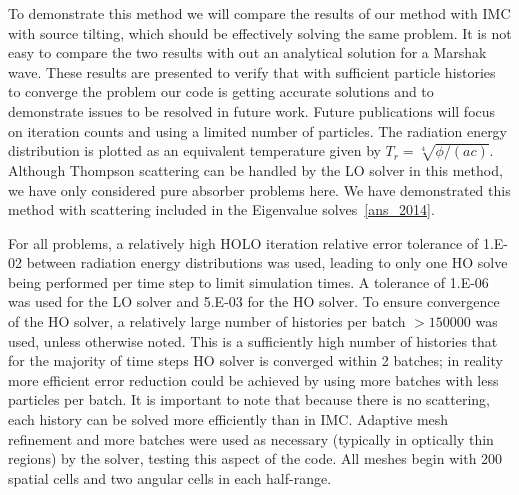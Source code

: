 \documentclass{mc2013}
\begin{document}

To demonstrate this method we will compare the results of our method with IMC with
source tilting, which should be effectively solving the same problem.  It is not easy
to compare the two results with out an analytical solution for a Marshak wave.  
These results are presented to verify that with sufficient particle histories
to converge the problem our code is getting accurate
solutions and to demonstrate issues to be resolved in future work.  Future
publications will focus on iteration counts and using a limited number of particles.
The radiation energy
distribution is plotted as an equivalent temperature given by
$T_r=\sqrt[4]{\phi/(ac)}$.  Although Thompson scattering
can be handled by the LO solver in this method, we have only considered pure absorber
problems here.  We have demonstrated this method with scattering included in the
Eigenvalue solves~\eqref{ans_2014}.

For all problems, a relatively high HOLO iteration relative error tolerance of 1.E-02 between
radiation energy distributions was used, leading to only one HO solve being performed
per time step to limit simulation times.  A tolerance of 1.E-06 was used for the LO
solver and 5.E-03 for the HO solver.  To ensure convergence of the HO solver, a
relatively large number of histories per batch $>150000$ was used,
unless otherwise noted.   This is a sufficiently
high number of histories that for the majority of time steps HO solver is converged within 2
batches; in reality more efficient error reduction could be achieved by using more
batches with less particles per batch.  It is important to note that because there is no scattering, each history can be solved more efficiently than in IMC.  Adaptive mesh refinement and more batches
were used as necessary (typically in optically thin regions) by the
solver, testing this aspect of the code.  All meshes begin with 200 spatial cells and
two angular cells in each half-range.

\end{document}
